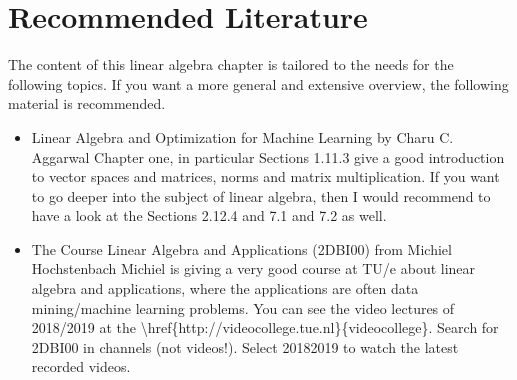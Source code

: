 \documentclass[letterpaper,10pt,english]{jupyterBook}
\begin{document}
\section{Recommended Literature}
\label{\detokenize{linalg:recommended-literature}}
\sphinxAtStartPar
The content of this linear algebra chapter is tailored to the needs for the following topics. If you want a more general and extensive overview, the following material is recommended.
\begin{itemize}
\item {} 
\sphinxAtStartPar
Linear Algebra and Optimization for Machine Learning by Charu C. Aggarwal
Chapter one, in particular Sections 1.1\sphinxhyphen{}1.3 give a good introduction to vector spaces and matrices, norms and matrix multiplication. If you want to go deeper into the subject of linear algebra, then I would recommend to have a look at the Sections 2.1\sphinxhyphen{}2.4 and 7.1 and 7.2 as well.

\item {} 
\sphinxAtStartPar
The Course Linear Algebra and Applications (2DBI00) from Michiel Hochstenbach
Michiel is giving a very good course at TU/e about linear algebra and applications, where the applications are often data mining/machine learning problems. You can see the video lectures of 2018/2019 at the \textbackslash{}href\{http://videocollege.tue.nl\}\{videocollege\}. Search for 2DBI00 in channels (not videos!). Select 2018\sphinxhyphen{}2019 to watch the latest recorded videos.

\end{itemize}

\sphinxstepscope
\end{document}
